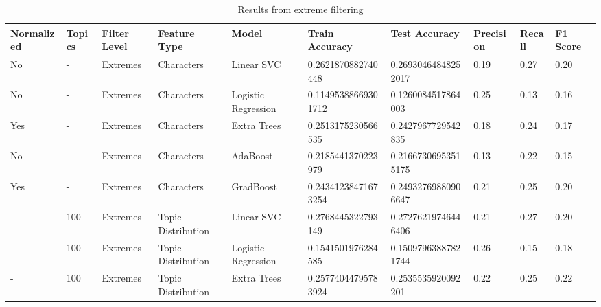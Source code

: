 \begin{table}[]
  \centering
  \caption{Results from extreme filtering}
  \label{tab:results-extremes}
  \begin{tabular}{@{}llllllllll@{}}
      \toprule
      \rowcolor[HTML]{FFFFFF} 
      \textbf{Normalized} & \textbf{Topics} & \textbf{Filter Level} & \textbf{Feature Type} & \textbf{Model}      & \textbf{Train Accuracy} & \textbf{Test Accuracy} & \textbf{Precision} & \textbf{Recall} & \textbf{F1 Score} \\ \midrule

    No                  & -               & Extremes              & Characters            & Linear SVC          & 0.2621870882740448      & 0.26930464848252017    & 0.19               & 0.27            & 0.20              \\
    No                  & -               & Extremes              & Characters            & Logistic Regression & 0.11495388669301712     & 0.1260084517864003     & 0.25               & 0.13            & 0.16              \\
    Yes                 & -               & Extremes              & Characters            & Extra Trees         & 0.2513175230566535      & 0.2427967729542835     & 0.18               & 0.24            & 0.17              \\
    No                  & -               & Extremes              & Characters            & AdaBoost            & 0.2185441370223979      & 0.21667306953515175    & 0.13               & 0.22            & 0.15              \\
    Yes                 & -               & Extremes              & Characters            & GradBoost           & 0.24341238471673254     & 0.24932769880906647    & 0.21               & 0.25            & 0.20              \\
    -                   & 100             & Extremes              & Topic Distribution    & Linear SVC          & 0.2768445322793149      & 0.27276219746446406    & 0.21               & 0.27            & 0.20              \\
    -                   & 100             & Extremes              & Topic Distribution    & Logistic Regression & 0.1541501976284585      & 0.15097963887821744    & 0.26               & 0.15            & 0.18              \\
    -                   & 100             & Extremes              & Topic Distribution    & Extra Trees         & 0.25774044795783924     & 0.2535535920092201     & 0.22               & 0.25            & 0.22              \\

\end{tabular}
\end{table}
